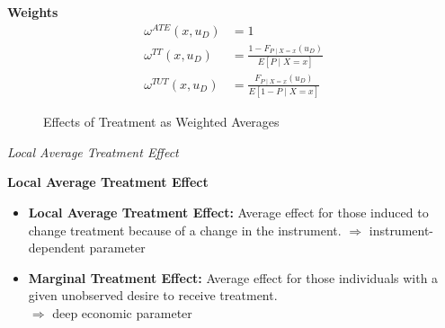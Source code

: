 \begin{frame}
	\textbf{Weights}
	\begin{align*}
		\omega^{ATE}(x, u_D) & = 1 \\
		\omega^{TT}(x, u_D) & = \frac{1 - F_{P\mid X=x}(u_D)}{E[P \mid X = x]}\\
		\omega^{TUT}(x, u_D) & = \frac{F_{P\mid X=x}(u_D)}{E[1 - P \mid X = x]}
	\end{align*}
\end{frame}
\begin{frame}
	\begin{figure}\caption{Effects of Treatment as Weighted Averages}
	\end{figure}
\end{frame}
\begin{frame}\begin{center}
		\LARGE\textit{Local Average Treatment Effect}
\end{center}\end{frame}
\begin{frame}
	\textbf{Local Average Treatment Effect}
	\begin{itemize}\setlength\itemsep{1em}
		\item \textbf{Local Average Treatment Effect:} Average effect for those induced
		to change treatment because of a change in the instrument.\medskip
		\(\Rightarrow\) instrument-dependent parameter\vspace{0.4cm}

		\item \textbf{Marginal Treatment Effect:} Average effect for those individuals
		with a given unobserved desire to receive treatment.\\\vspace{0.2cm}
		\(\Rightarrow\) deep economic parameter
	\end{itemize}
\end{frame}
